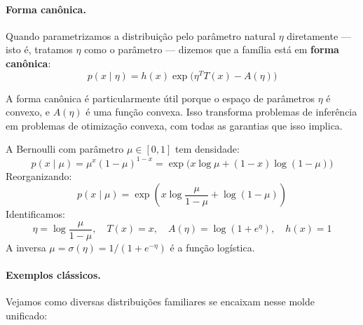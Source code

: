 \documentclass{tufte-handout}
\begin{document}
\paragraph{Forma canônica.}

Quando parametrizamos a distribuição pelo parâmetro natural $\eta$ diretamente --- isto é, tratamos $\eta$ como o parâmetro --- dizemos que a família está em \textbf{forma canônica}:
\[
p(x \mid \eta) = h(x) \exp\big(\eta^T T(x) - A(\eta)\big)
\]

A forma canônica é particularmente útil porque o espaço de parâmetros $\eta$ é convexo, e $A(\eta)$ é uma função convexa. Isso transforma problemas de inferência em problemas de otimização convexa, com todas as garantias que isso implica.

\begin{exmp}
    A Bernoulli com parâmetro $\mu \in [0,1]$ tem densidade:
    \[
    p(x \mid \mu) = \mu^x (1-\mu)^{1-x} = \exp\big(x \log \mu + (1-x) \log(1-\mu)\big)
    \]
    Reorganizando:
    \[
    p(x \mid \mu) = \exp\!\left(x \log\frac{\mu}{1-\mu} + \log(1-\mu)\right)
    \]
    Identificamos:
    \[
    \eta = \log\frac{\mu}{1-\mu}, \quad T(x) = x, \quad A(\eta) = \log(1 + e^\eta), \quad h(x) = 1
    \]
    A inversa $\mu = \sigma(\eta) = 1/(1+e^{-\eta})$ é a função logística.
\end{exmp}

\paragraph{Exemplos clássicos.}

Vejamos como diversas distribuições familiares se encaixam nesse molde unificado:
\end{document}
